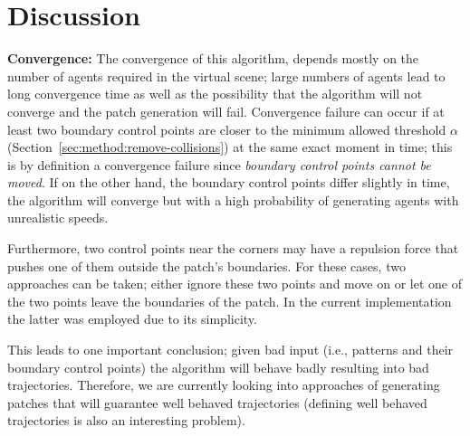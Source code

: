 \section{Discussion}
\label{sec:discussion}

\textbf{Convergence:}
The convergence of this algorithm, depends mostly on the number of agents required in the virtual scene; large numbers of agents lead to long convergence time as well as the possibility that the algorithm will not converge and the patch generation will fail.
Convergence failure can occur if at least two boundary control points are closer to the minimum allowed threshold $\alpha$ (Section~\ref{sec:method:remove-collisions}) at the same exact moment in time; this is by definition a convergence failure since \emph{boundary control points cannot be moved}.
If on the other hand, the boundary control points differ slightly in time, the algorithm will converge but with a high probability of generating agents with unrealistic speeds.

% 

 Furthermore, two control points near the corners may have a repulsion force that pushes one of them outside the patch's boundaries.
For these cases, two approaches can be taken; either ignore these two points and move on or let one of the two points leave the boundaries of the patch.
In the current implementation the latter was employed due to its simplicity.
 
 This leads to one important conclusion; given bad input (i.e., patterns and their boundary control points) the algorithm will behave badly resulting into bad trajectories.
 Therefore, we are currently looking into approaches of generating patches that will guarantee well behaved trajectories (defining well behaved trajectories is also an interesting problem).


